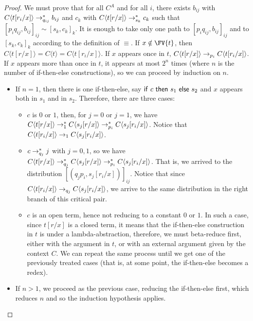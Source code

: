 \begin{proof}
We must prove that for all $C^A$ and for all $i$, there exists $b_{ij}$ with $C\langle t[r_i/x]\rangle\topr[q_{ij}]^* b_{ij}$ and $c_k$ with $C\langle t[r/x]\rangle\topr[s_{k}]^* c_k$ such that
\(
  [p_iq_{ij},b_{ij}]_{ij} \sim [s_k,c_k]_k
\).
It is enough to take only one path to $[p_iq_{ij},b_{ij}]_{ij}$ and to $[s_k,c_k]_k$ according to the definition of $\equiv$.
If $x\notin\FV{t}$, then 
    \(
      C\langle t[r/x]\rangle
      =
      C\langle t\rangle
      =
      C\langle t[r_i/x]\rangle
    \).
  If $x$ appears once in $t$, 
    \(
      C\langle t[r/x]\rangle
      \topr[p_i] C\langle t[r_i/x]\rangle
    \).
    If $x$ appears more than once in $t$, it appears at most $2^n$ times (where $n$ is the number of if-then-else constructions), so we can proceed by induction on $n$.
    \begin{itemize}
      \item 
	If $n=1$, then there is one if-then-else, say $\ite c{s_1}{s_2}$ and $x$ appears both in $s_1$ and in $s_2$. Therefore, there are three cases:
	\begin{itemize}

	  \item $c$ is $0$ or $1$, then, for $j=0$ or $j=1$, we have
	    \(
	      C\langle t[r/x]\rangle
	      \topr[1]^*
	      C\langle s_j[r/x]\rangle
	      \topr[p_i]^*
	      C\langle s_j[r_i/x]\rangle
	    \).
	    Notice that $C\langle t[r_i/x]\rangle\topr[1] C\langle s_j[r_i/x]\rangle$.
	  \item $c\topr[q_j]^* j$ with $j=0,1$, so we have
	    \(
	      C\langle t[r/x]\rangle
	      \topr[q_j]^*
	      C\langle s_j[r/x]\rangle
	      \topr[p_i]^*
	      C\langle s_j[r_i/x]\rangle
	    \).
	    That is, we arrived to the distribution $[(q_jp_i,s_j[r_i/x])]_{ij}$.
	    Notice that since $C\langle t[r_i/x]\rangle\topr[q_j]
	    C\langle s_j[r_i/x]\rangle$, we arrive to the same distribution in the right branch of this critical pair.
	  \item $c$ is an open term, hence not reducing to a constant $0$ or $1$.
	    In such a case, since $t[r/x]$ is a closed term, it means that the if-then-else construction in $t$ is under a lambda-abstraction, therefore, we must beta-reduce first, either with the argument in $t$, or with an external argument given by the context $C$. We can repeat the same process until we get one of the previously treated cases (that is, at some point, the if-then-else becomes a redex).
	\end{itemize}
      \item If $n>1$, we proceed as the previous case, reducing the if-then-else first, which reduces $n$ and so the induction hypothesis applies.\qedhere
    \end{itemize}
\end{proof}

